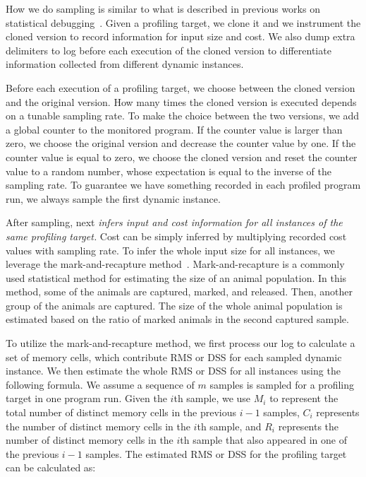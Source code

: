{{How we do sampling is similar to what is described in previous works 
on statistical debugging~\cite{liblit03,liblit05,CCI,SongOOPSLA2014,ldoctor}.
Given a profiling target, 
we clone it
and we instrument the cloned version to record information for input size and cost.
We also dump extra delimiters to log before each 
execution of the cloned version
to differentiate information collected from different dynamic instances. 

Before each execution of a profiling target, 
we choose between the cloned version and the original version. 
How many times the cloned version is executed 
depends on a tunable sampling rate. 
To make the choice between the two versions,
we add a global counter to the monitored program. 
If the counter value is larger than zero, 
we choose the original version and decrease the counter value by one.
If the counter value is equal to zero,
we choose the cloned version and reset the counter value to 
a random number, 
whose expectation is 
equal to the inverse of the sampling rate.  
To guarantee we have something recorded in 
each profiled program run,
we always sample the first dynamic instance. 




After sampling, \Tool next \emph{infers input and cost information
for all instances of the same profiling target.} 
Cost can be simply inferred by multiplying recorded cost values with sampling rate.
To infer the whole input size for all instances, 
we leverage the mark-and-recapture method~\cite{mark-recapture}. 
Mark-and-recapture is a commonly used statistical method 
for estimating the size of an animal population. 
In this method, some of the animals are captured, marked, and released. 
Then, another group of the animals are captured.
The size of the whole animal population is estimated 
based on the ratio of marked animals in the second captured sample. 
 

To utilize the mark-and-recapture method, 
we first process our log to calculate a set of memory cells, 
which contribute RMS
or DSS for each sampled dynamic instance. 
We then estimate the whole RMS or DSS for all instances using the following formula.
We assume a sequence of $m$ samples is sampled for a profiling target 
in one program run.
Given the $i$th sample, we use $M_i$ to represent the 
total number of distinct memory cells in the previous $i-1$ samples, 
$C_i$ represents the number of distinct memory cells in the $i$th sample,
and $R_i$ represents the number of distinct memory cells in 
the $i$th sample that also appeared in one of the previous $i-1$ samples.
The estimated RMS or DSS for the profiling target can be calculated as:


}}
